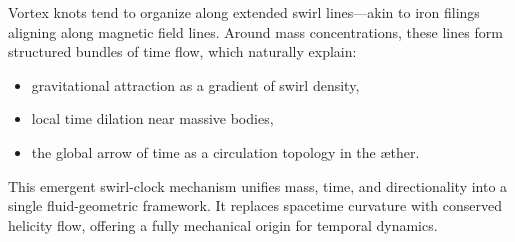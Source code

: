 Vortex knots tend to organize along extended swirl lines—akin to iron filings aligning along magnetic field lines. Around mass concentrations, these lines form structured bundles of time flow, which naturally explain:
\begin{itemize}
    \item gravitational attraction as a gradient of swirl density,
    \item local time dilation near massive bodies,
    \item the global arrow of time as a circulation topology in the æther.
\end{itemize}

This emergent swirl-clock mechanism unifies mass, time, and directionality into a single fluid-geometric framework. It replaces spacetime curvature with conserved helicity flow, offering a fully mechanical origin for temporal dynamics.
